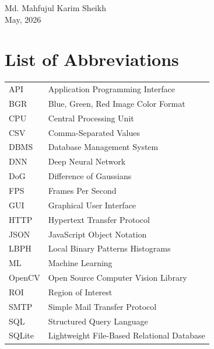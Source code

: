 \documentclass[12pt,a4paper]{report}
\begin{document}
\vspace{2em}
\begin{flushright}
Md. Mahfujul Karim Sheikh\\
May, 2026
\end{flushright}

\clearpage

\clearpage
{}
\tableofcontents

\clearpage
{}
\listoftables

\clearpage
{}
\listoffigures

\clearpage

\chapter*{List of Abbreviations}
\vspace{2em}
\begin{tabular}{ll}
API & Application Programming Interface \\
BGR & Blue, Green, Red Image Color Format \\
CPU & Central Processing Unit \\
CSV & Comma-Separated Values \\
DBMS & Database Management System \\
DNN & Deep Neural Network \\
DoG & Difference of Gaussians \\
FPS & Frames Per Second \\
GUI & Graphical User Interface \\
HTTP & Hypertext Transfer Protocol \\
JSON & JavaScript Object Notation \\
LBPH & Local Binary Patterns Histograms \\
ML & Machine Learning \\
OpenCV & Open Source Computer Vision Library \\
ROI & Region of Interest \\
SMTP & Simple Mail Transfer Protocol \\
SQL & Structured Query Language \\
SQLite & Lightweight File-Based Relational Database \\
\end{tabular}
\end{document}
